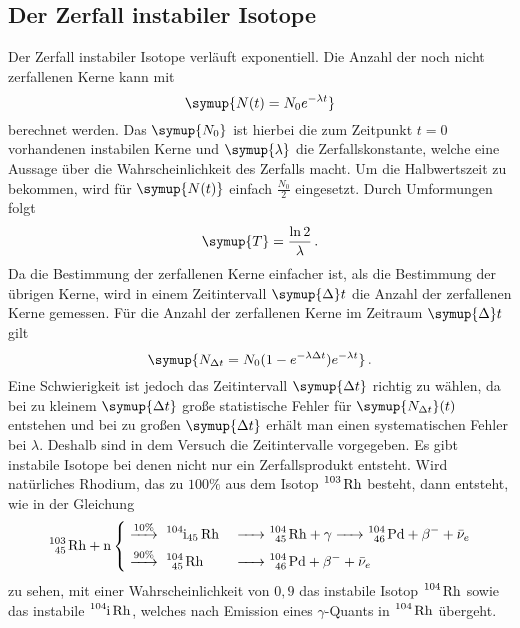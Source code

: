 \subsection{Der Zerfall instabiler Isotope}
Der Zerfall instabiler Isotope verläuft exponentiell. Die Anzahl der noch nicht zerfallenen Kerne kann mit 
\begin{equation}
    \symup{N(t)=N_0 e^{- \lambda t}}
    \label{eqn:isotope}
\end{equation}
berechnet werden. Das $\symup{N_0}$ ist hierbei die zum Zeitpunkt $t=0$ vorhandenen instabilen Kerne und $\symup{\lambda}$ die Zerfallskonstante, welche eine Aussage über die Wahrscheinlichkeit des Zerfalls macht.
Um die Halbwertszeit zu bekommen, wird für $\symup{N(t)}$ einfach $\frac{N_0}{2}$ eingesetzt. Durch Umformungen folgt
\begin{equation}
    \symup{T}=\frac{\ln{2}}{\lambda} \, .
    \label{eqn:halbw}
\end{equation}
Da die Bestimmung der zerfallenen Kerne einfacher ist, als die Bestimmung der übrigen Kerne, wird in einem Zeitintervall $\symup{\Delta}t$
die Anzahl der zerfallenen Kerne gemessen. Für die Anzahl der zerfallenen Kerne im Zeitraum $\symup{\Delta}t$ gilt
\begin{equation}
    \symup{N_{\Delta t}=N_0(1-e^{-\lambda \Delta t})e^{-\lambda t}} \, .
\end{equation}
Eine Schwierigkeit ist jedoch das Zeitintervall $\symup{\Delta t}$ richtig zu wählen, da
bei zu kleinem $\symup{\Delta t}$ große statistische Fehler für $\symup{N_{\Delta t}}(t)$ entstehen 
und bei zu großen $\symup{\Delta t}$ erhält man einen systematischen Fehler bei $\lambda$. 
Deshalb sind in dem Versuch die Zeitintervalle vorgegeben. 
Es gibt instabile Isotope bei denen nicht nur ein Zerfallsprodukt entsteht.
Wird natürliches Rhodium, das zu $100\%$ aus dem Isotop $\ce{^103 Rh}$ besteht, dann entsteht, wie in der Gleichung
\begin{equation}
   \ce{^103_45 Rh + n } 
    \begin{dcases}
        \stackrel{10\%}{\ce{->}}\ce{ ^104i_45 Rh &-> ^104_45 Rh + $\gamma$ -> ^104_46 Pd + $\beta$- + $\bar{\nu}_e$}  \\
        \stackrel{90\%}{\ce{->}}\ce{ ^104_45 Rh  &-> ^104_46 Pd + $\beta$- + $\bar{\nu}_e$} 
    \end{dcases}
\end{equation}
zu sehen, mit einer Wahrscheinlichkeit von $0,9$ das instabile Isotop $\ce{^104 Rh}$ sowie das instabile $\ce{^104i Rh}$, welches nach Emission eines $\gamma$-Quants in $\ce{^104 Rh}$ übergeht.
